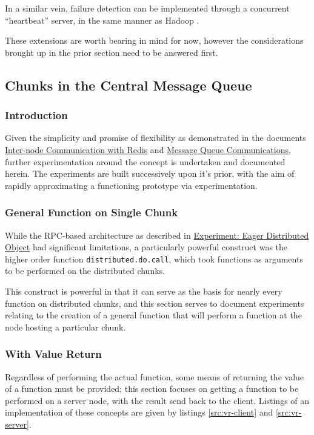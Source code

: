 In a similar vein, failure detection can be implemented through a
concurrent ``heartbeat'' server, in the same manner as Hadoop
\cite{white2012hadoop}.

These extensions are worth bearing in mind for now, however the
considerations brought up in the prior section need to be answered
first.

\subsection{Chunks in the Central Message Queue}

\subsubsection{Introduction}

Given the simplicity and promise of flexibility as demonstrated in the
documents \href{inter-node-comm-w-redis.pdf}{Inter-node Communication with
Redis} and \href{message-queues-comms.pdf}{Message Queue Communications},
further experimentation around the concept is undertaken and documented herein.
The experiments are built successively upon it's prior, with the aim of rapidly
approximating a functioning prototype via experimentation.

\subsubsection{General Function on Single Chunk}

While the RPC-based architecture as described in
\href{experiment-eager-dist-obj-pre.pdf}{Experiment: Eager Distributed Object}
had significant limitations, a particularly powerful construct was the higher
order function \texttt{distributed.do.call}, which took functions as arguments
to be performed on the distributed chunks.

This construct is powerful in that it can serve as the basis for nearly every
function on distributed chunks, and this section serves to document experiments
relating to the creation of a general function that will perform a function at
the node hosting a particular chunk.

\subsubsection{With Value Return}\label{sec:val-ret}

Regardless of performing the actual function, some means of returning the value
of a function must be provided; this section focuses on getting a function to
be performed on a server node, with the result send back to the client.
Listings of an implementation of these concepts are given by listings
\ref{src:vr-client} and \ref{src:vr-server}.

